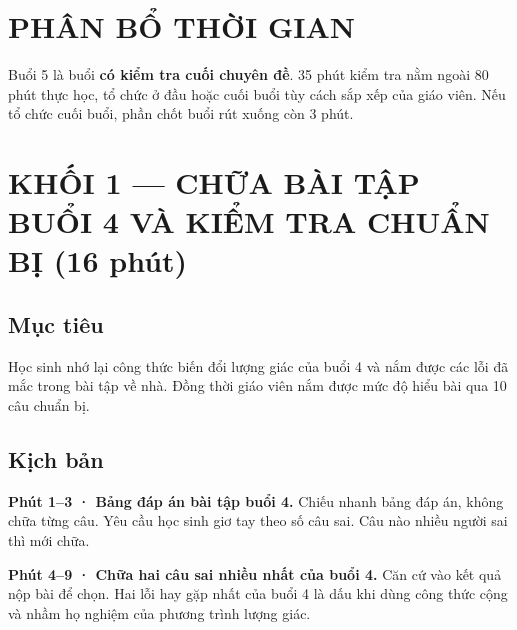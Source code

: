 \documentclass[11pt, a4paper]{article}
\begin{document}

\section{PHÂN BỔ THỜI GIAN}


Buổi 5 là buổi \textbf{có kiểm tra cuối chuyên đề}. 35 phút kiểm tra nằm ngoài 80 phút thực học, tổ chức ở đầu hoặc cuối buổi tùy cách sắp xếp của giáo viên. Nếu tổ chức cuối buổi, phần chốt buổi rút xuống còn 3 phút.

\section{KHỐI 1 — CHỮA BÀI TẬP BUỔI 4 VÀ KIỂM TRA CHUẨN BỊ (16 phút)}

\subsection{Mục tiêu}

Học sinh nhớ lại công thức biến đổi lượng giác của buổi 4 và nắm được các lỗi đã mắc trong bài tập về nhà. Đồng thời giáo viên nắm được mức độ hiểu bài qua 10 câu chuẩn bị.

\subsection{Kịch bản}

\textbf{Phút 1–3 · Bảng đáp án bài tập buổi 4.} Chiếu nhanh bảng đáp án, không chữa từng câu. Yêu cầu học sinh giơ tay theo số câu sai. Câu nào nhiều người sai thì mới chữa.

\textbf{Phút 4–9 · Chữa hai câu sai nhiều nhất của buổi 4.} Căn cứ vào kết quả nộp bài để chọn. Hai lỗi hay gặp nhất của buổi 4 là dấu khi dùng công thức cộng và nhầm họ nghiệm của phương trình lượng giác.
\end{document}
